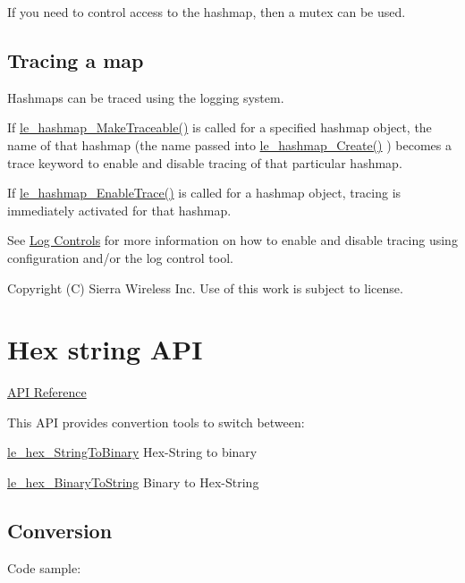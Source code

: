 If you need to control access to the hashmap, then a mutex can be used.\hypertarget{c_hashmap_c_hashmap_tracing}{}\subsection{Tracing a map}\label{c_hashmap_c_hashmap_tracing}
Hashmaps can be traced using the logging system.

If {\ttfamily \hyperlink{le__hashmap_8h_a853082500b05e57d899606cfc0e34fab}{le\+\_\+hashmap\+\_\+\+Make\+Traceable()}} is called for a specified hashmap object, the name of that hashmap (the name passed into \hyperlink{le__hashmap_8h_ade79896a5b2ceec82c570fe21f7efe3a}{le\+\_\+hashmap\+\_\+\+Create()} ) becomes a trace keyword to enable and disable tracing of that particular hashmap.

If {\ttfamily \hyperlink{le__hashmap_8h_a10b30e794df1c866fe39c40c7949eb29}{le\+\_\+hashmap\+\_\+\+Enable\+Trace()}} is called for a hashmap object, tracing is immediately activated for that hashmap.

See \hyperlink{c_logging_c_log_controlling}{Log Controls} for more information on how to enable and disable tracing using configuration and/or the log control tool.





Copyright (C) Sierra Wireless Inc. Use of this work is subject to license. \hypertarget{c_hex}{}\section{Hex string A\+P\+I}\label{c_hex}
\hyperlink{le__hex_8h}{A\+P\+I Reference}





This A\+P\+I provides convertion tools to switch between\+:
\begin{DoxyItemize}
\item \hyperlink{le__hex_8h_a2ad2c35d567e8fc3fc962a58272b093d}{le\+\_\+hex\+\_\+\+String\+To\+Binary} Hex-\/\+String to binary
\item \hyperlink{le__hex_8h_a2482e5240d47b176e41369fc5a654551}{le\+\_\+hex\+\_\+\+Binary\+To\+String} Binary to Hex-\/\+String
\end{DoxyItemize}\hypertarget{c_hex_hex_conversion}{}\subsection{Conversion}\label{c_hex_hex_conversion}
Code sample\+:


